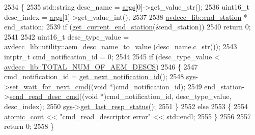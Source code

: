\begin{DoxyCode}
2534 \{
2535     std::string desc\_name = \hyperlink{namespaceastime__fitline_a8187411843a6284ffb964ef3fb9fcab3}{args}[0]->get\_value\_str();
2536     uint16\_t desc\_index = \hyperlink{namespaceastime__fitline_a8187411843a6284ffb964ef3fb9fcab3}{args}[1]->get\_value\_int();
2537 
2538     \hyperlink{classavdecc__lib_1_1end__station}{avdecc\_lib::end\_station} * end\_station;
2539     \textcolor{keywordflow}{if} (\hyperlink{classcmd__line_aa7ddf8d9fbcf5d1c6c5f329bc850418c}{get\_current\_end\_station}(&end\_station))
2540         \textcolor{keywordflow}{return} 0;
2541 
2542     uint16\_t desc\_type\_value = \hyperlink{namespaceavdecc__lib_1_1utility_a9f6076e32fa227555a95b6e95ea1e29b}{avdecc\_lib::utility::aem\_desc\_name\_to\_value}
      (desc\_name.c\_str());
2543     intptr\_t cmd\_notification\_id = 0;
2544 
2545     \textcolor{keywordflow}{if} (desc\_type\_value < \hyperlink{namespaceavdecc__lib_ac7b7d227e46bc72b63ee9e9aae15902fa1e5a2c47a663ddd337dec63b09b44823}{avdecc\_lib::TOTAL\_NUM\_OF\_AEM\_DESCS})
2546     \{
2547         cmd\_notification\_id = \hyperlink{classcmd__line_a57486218387d1aa9d262eb7c176154ad}{get\_next\_notification\_id}();
2548         \hyperlink{classcmd__line_a485db4800e331cb4052c447fdf5d154e}{sys}->\hyperlink{classavdecc__lib_1_1system_a26b769584f10225077da47583edda33e}{set\_wait\_for\_next\_cmd}((\textcolor{keywordtype}{void} *)cmd\_notification\_id);
2549         end\_station->\hyperlink{classavdecc__lib_1_1end__station_a28ef0a87c0f86fde09e184afba1dbc56}{send\_read\_desc\_cmd}((\textcolor{keywordtype}{void} *)cmd\_notification\_id, desc\_type\_value, 
      desc\_index);
2550         \hyperlink{classcmd__line_a485db4800e331cb4052c447fdf5d154e}{sys}->\hyperlink{classavdecc__lib_1_1system_aa63e8d1a4e51f695cdcccc9340922407}{get\_last\_resp\_status}();
2551     \}
2552     \textcolor{keywordflow}{else}
2553     \{
2554         \hyperlink{cmd__line_8h_a0bc38ccc65c79ba06c6fcd7b4bf554c3}{atomic\_cout} << \textcolor{stringliteral}{"cmd\_read\_descriptor error"} << std::endl;
2555     \}
2556 
2557     \textcolor{keywordflow}{return} 0;
2558 \}
\end{DoxyCode}


